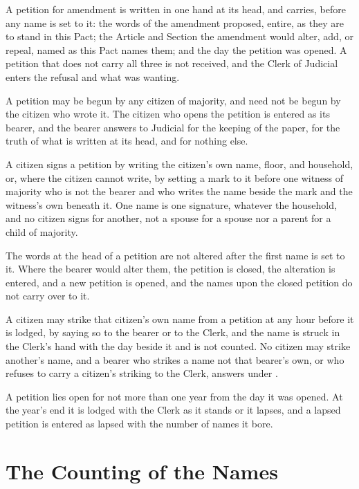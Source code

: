 \begin{clauses}
\item A petition for amendment is written in one hand at its head, and carries, before any name is set to it: the words of the amendment proposed, entire, as they are to stand in this Pact; the Article and Section the amendment would alter, add, or repeal, named as this Pact names them; and the day the petition was opened. A petition that does not carry all three is not received, and the Clerk of Judicial enters the refusal and what was wanting.
\item A petition may be begun by any citizen of majority, and need not be begun by the citizen who wrote it. The citizen who opens the petition is entered as its bearer, and the bearer answers to Judicial for the keeping of the paper, for the truth of what is written at its head, and for nothing else.
\item A citizen signs a petition by writing the citizen's own name, floor, and household, or, where the citizen cannot write, by setting a mark to it before one witness of majority who is not the bearer and who writes the name beside the mark and the witness's own beneath it. One name is one signature, whatever the household, and no citizen signs for another, not a spouse for a spouse nor a parent for a child of majority.
\item The words at the head of a petition are not altered after the first name is set to it. Where the bearer would alter them, the petition is closed, the alteration is entered, and a new petition is opened, and the names upon the closed petition do not carry over to it.
\item A citizen may strike that citizen's own name from a petition at any hour before it is lodged, by saying so to the bearer or to the Clerk, and the name is struck in the Clerk's hand with the day beside it and is not counted. No citizen may strike another's name, and a bearer who strikes a name not that bearer's own, or who refuses to carry a citizen's striking to the Clerk, answers under .
\item A petition lies open for not more than one year from the day it was opened. At the year's end it is lodged with the Clerk as it stands or it lapses, and a lapsed petition is entered as lapsed with the number of names it bore.
\end{clauses}

\section{The Counting of the Names}
\label{sec:amendment:counting-of-the-names}

